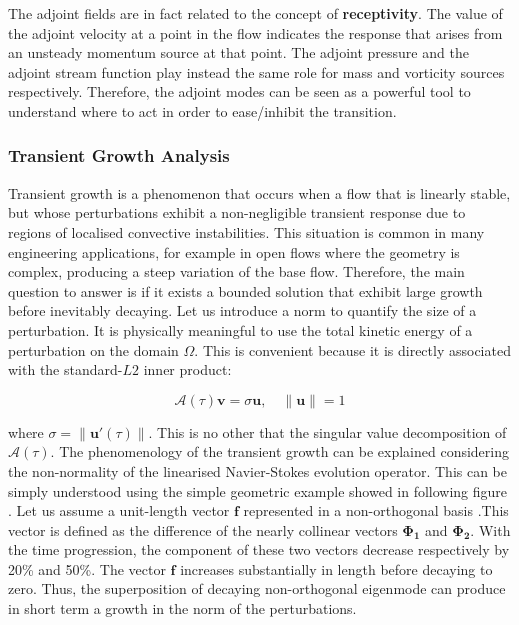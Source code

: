 The adjoint fields are in fact related to the concept of \textbf{receptivity}. The value of the adjoint velocity at a point in the flow indicates the response that arises from an unsteady momentum source at that point. The adjoint pressure and the adjoint stream function play instead the same role for mass and vorticity sources respectively. Therefore, the adjoint modes can be seen as a powerful tool to understand where to act in order to ease/inhibit the transition.

\subsubsection{Transient Growth Analysis}

Transient growth  is a phenomenon that occurs when a flow that is linearly stable, but whose perturbations exhibit a non-negligible transient response due to regions of localised convective instabilities. This situation is common in many engineering applications, for example in open flows where the geometry is complex, producing a steep variation of the base flow. Therefore, the main question to answer is if it exists a bounded solution that exhibit large growth before inevitably decaying. Let us introduce a norm to quantify the size of a perturbation. It is physically meaningful to use the total kinetic energy of a perturbation on the domain $\Omega$. This is convenient because it is directly associated with the
standard-$L2$ inner product:

\begin{equation}
\mathcal{A}(\tau)\mathbf{v}=\sigma \mathbf{u}, \quad \left\| \mathbf{u} \right\|=1
\end{equation}


where $\sigma=\left\| \mathbf{u'}(\tau)\right\|$. This is no other that the singular value decomposition of $\mathcal{A}(\tau)$. The phenomenology of the transient growth can be explained considering the non-normality of the linearised Navier-Stokes evolution operator. This can be simply understood using the simple geometric example showed in following figure . Let us assume a unit-length vector $\mathbf{f}$ represented in a non-orthogonal basis .This vector is defined as the difference of the nearly collinear vectors $\mathbf{\Phi_1}$ and $\mathbf{\Phi_2}$.  With the time progression, the component of these two vectors decrease respectively by 20\% and 50\%. The vector $\mathbf{f}$ increases substantially in length before decaying to zero. Thus, the superposition of decaying non-orthogonal eigenmode can produce in short term a growth in the norm of the perturbations.


